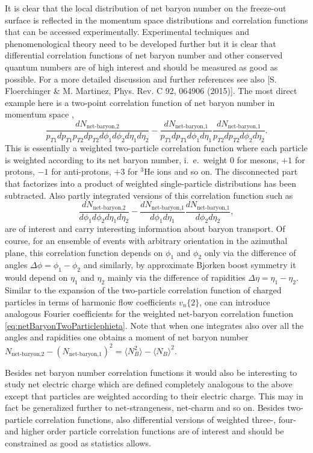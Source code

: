 It is clear that the local distribution of net baryon number on the freeze-out surface is reflected in the momentum space distributions and correlation functions that can be accessed experimentally. Experimental techniques and phenomenological theory need to be developed further but it is clear that differential correlation functions of net baryon number and other conserved quantum numbers are of high interest and should be measured as good as possible. For a more detailed discussion and further references see also [S. Floerchinger \& M. Martinez, Phys. Rev. C 92, 064906 (2015)].
The most direct example here is a two-point correlation function of net baryon number in momentum space \cite{Floerchinger:2015efa},
\begin{equation}
\frac{dN_\text{net-baryon,2}}{p_{T1} dp_{T1} p_{T2} dp_{T2}d\phi_1d\phi_2d\eta_1 d\eta_2} - \frac{dN_\text{net-baryon,1}}{p_{T1} dp_{T1} d\phi_1d\eta_1}  \frac{dN_\text{net-baryon,1}}{p_{T2} dp_{T2} d\phi_2d\eta_2}.
\end{equation}
This is essentially a weighted two-particle correlation function where each particle is weighted according to its net baryon number, i.\ e.\ weight $0$ for mesons, $+1$ for protons, $-1$ for anti-protons, $+3$ for $^3\text{He}$ ions and so on. The disconnected part that factorizes into a product of weighted single-particle distributions has been subtracted. Also partly integrated versions of this correlation function such as
\begin{equation}
\frac{dN_\text{net-baryon,2}}{d\phi_1d\phi_2d\eta_1 d\eta_2} - \frac{dN_\text{net-baryon,1}}{d\phi_1d\eta_1} \frac{dN_\text{net-baryon,1}}{d\phi_2d\eta_2} ,
\label{eq:netBaryonTwoParticlephieta}
\end{equation}
are of interest and carry interesting information about baryon transport. Of course, for an ensemble of events with arbitrary orientation in the azimuthal plane, this correlation function depends on $\phi_1$ and $\phi_2$ only via the difference of angles $\Delta\phi=\phi_1-\phi_2$ and similarly, by approximate Bjorken boost symmetry it would depend on $\eta_1$ and $\eta_2$ mainly via the difference of rapidities $\Delta\eta = \eta_1-\eta_2$. Similar to the expansion of the two-particle correlation function of charged particles in terms of harmonic flow coefficients $v_n\{2\}$, one can introduce analogous Fourier coefficients for the weighted net-baryon correlation function \eqref{eq:netBaryonTwoParticlephieta}. Note that when one integrates also over all the angles and rapidities one obtains a moment of net baryon number $N_\text{net-baryon,2}-(N_\text{net-baryon,1})^2=\langle N_B^2 \rangle - \langle  N_B \rangle^2$. 

Besides net baryon number correlation functions it would also be interesting to study net electric charge \cite{Aziz:2004qu, Ling:2013ksb} which are defined completely analogous to the above except that particles are weighted according to their electric charge. This may in fact be generalized further to net-strangeness, net-charm and so on. Besides two-particle correlation functions, also differential versions of weighted three-, four- and higher order particle correlation functions  are of interest and should be constrained as good as statistics allows.